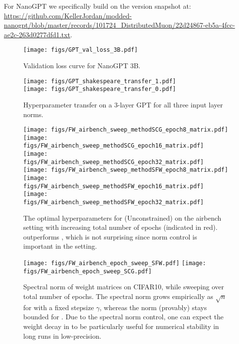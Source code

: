 For NanoGPT we specifically build on the version snapshot at:\\ \url{https://github.com/KellerJordan/modded-nanogpt/blob/master/records/101724_DistributedMuon/22d24867-eb5a-4fcc-ae2c-263d0277dfd1.txt}.


\begin{figure*}[!h]
\centering
\texttt{[image: figs/GPT\_val\_loss\_3B.pdf]}
\caption{Validation loss curve for NanoGPT 3B.}
\label{fig:NanoGPT:3B:loss-curve}
\end{figure*}


\begin{figure*}[!h]
\centering
\texttt{[image: figs/GPT\_shakespeare\_transfer\_1.pdf]}\\
\texttt{[image: figs/GPT\_shakespeare\_transfer\_0.pdf]}%
\caption{Hyperparameter transfer on a 3-layer GPT for all three input layer norms.}
\label{fig:GPT:shakespeare}
\end{figure*}


\begin{figure*}[!h]
\centering
\texttt{[image: figs/FW\_airbench\_sweep\_methodSCG\_epoch8\_matrix.pdf]}%
\texttt{[image: figs/FW\_airbench\_sweep\_methodSCG\_epoch16\_matrix.pdf]}%
\texttt{[image: figs/FW\_airbench\_sweep\_methodSCG\_epoch32\_matrix.pdf]}
\texttt{[image: figs/FW\_airbench\_sweep\_methodSFW\_epoch8\_matrix.pdf]}
\texttt{[image: figs/FW\_airbench\_sweep\_methodSFW\_epoch16\_matrix.pdf]}
\texttt{[image: figs/FW\_airbench\_sweep\_methodSFW\_epoch32\_matrix.pdf]}

\caption{The optimal hyperparameters for ({\sc Unconstrained}) \Scion on the airbench setting with increasing total number of epochs (indicated in red).
\Scion outperforms \uScion, which is not surprising since norm control is important in the setting.}
\label{fig:GSFW:hyperparam_sweep}
\end{figure*}


\begin{figure}[t]
\centering
\texttt{[image: figs/FW\_airbench\_epoch\_sweep\_SFW.pdf]}%
\texttt{[image: figs/FW\_airbench\_epoch\_sweep\_SCG.pdf]}
\caption{Spectral norm of weight matrices on CIFAR10, while sweeping over total number of epochs. 
The spectral norm grows empirically as $\sqrt{n}$ for \uScion with a fixed stepsize $\gamma$, whereas the norm (provably) stays bounded for \Scion.
Due to the spectral norm control, one can expect the weight decay in \Scion to be particularly useful for numerical stability in long runs in low-precision.}
\label{fig:epoch_sweep}
\end{figure}

